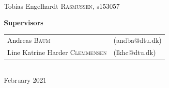 \begin{titlepage}
\begin{center}
\large Tobias Engelhardt \textsc{Rasmussen}, s153057 %
\end{center}
\vspace{1cm}
\begin{center}
\large \textbf{Supervisors} \\
\begin{tabular}{ll}
   \large Andreas \textsc{Baum}  & (andba@dtu.dk)  \\
   \large Line Katrine Harder \textsc{Clemmensen}  & (lkhc@dtu.dk) 
\end{tabular}
\\[5cm]
{\large February 2021}\\[3cm]
\end{center}





 


\end{titlepage}

